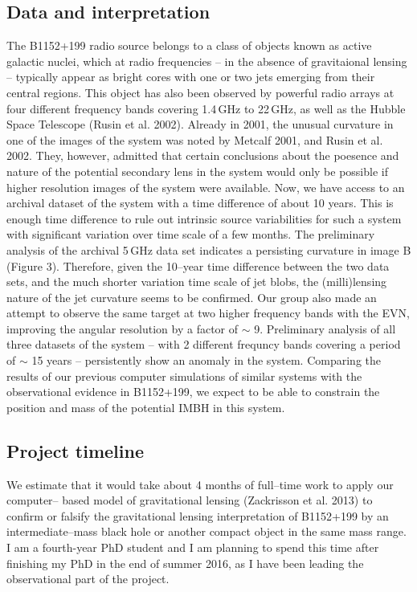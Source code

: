 \documentclass[a4paper, 11pt]{article}
\begin{document}
\subsection{Data and interpretation}
The B1152+199 radio source belongs to a class of objects known as active galactic nuclei, which at radio frequencies -- in the absence of gravitaional lensing -- typically appear as bright cores with one or two jets emerging from their central regions. This object has also been observed by powerful radio arrays at four different frequency bands covering 1.4\,GHz to 22\,GHz, as well as the Hubble Space Telescope (Rusin et al. 2002). Already in 2001, the unusual curvature in one of the images of the system was noted by Metcalf 2001, and Rusin et al. 2002. They, however, admitted that certain conclusions about the poesence and nature of the potential secondary lens in the system would only be possible if higher resolution images of the system were available. Now, we have access to an archival dataset of the system with a time difference of about 10 years. This is enough time difference to rule out intrinsic source variabilities for such a system with significant variation over time scale of a few months. The preliminary analysis of the archival 5\,GHz data set indicates a persisting curvature in image B (Figure 3). Therefore, given the 10--year time difference between the two data sets, and the much shorter variation time scale of jet blobs, the (milli)lensing nature of the jet curvature seems to be confirmed. Our group also made an attempt to observe the same target at two higher frequency bands with the EVN, improving the angular resolution by a factor of $\sim$ 9. Preliminary analysis of all three datasets of the system -- with 2 different frequncy bands covering a period of $\sim$ 15 years -- persistently show an anomaly in the system. Comparing the results of our previous computer simulations of similar systems with the observational evidence in B1152+199, we expect to be able to constrain the position and mass of the potential IMBH in this system.

\subsection{Project timeline}
We estimate that it would take about 4 months of full--time work to apply our computer-- based model of gravitational lensing (Zackrisson et al. 2013) to confirm or falsify the gravitational lensing interpretation of B1152+199 by an intermediate--mass black hole or another compact object in the same mass range. I am a fourth-year PhD student and I am planning to spend this time after finishing my PhD in the end of summer 2016, as I have been leading the observational part of the project.
\end{document}
